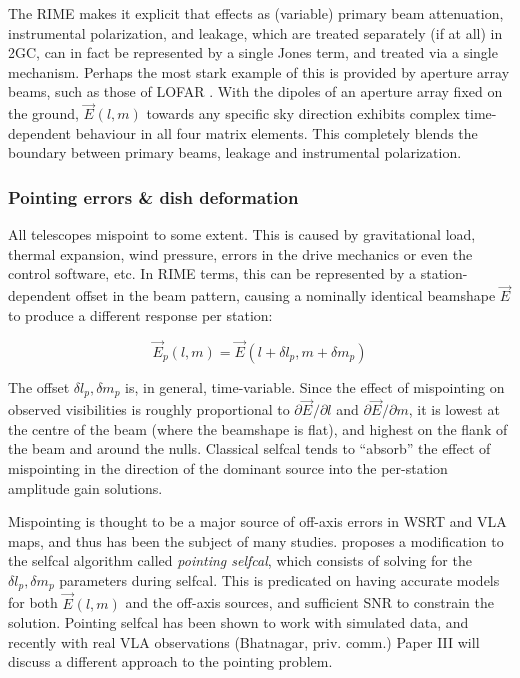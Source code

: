 \documentclass[referee]{aa}
\newcommand{\jones}[2]{\vec {#1}_{#2}}
\begin{document}
The RIME makes it explicit that effects as (variable) primary beam attenuation, instrumental polarization, and leakage, which are treated separately (if at all) in 2GC, can in fact be represented by a single Jones term, and treated via a single mechanism. Perhaps the most stark example of this is provided by aperture array beams, such as those of LOFAR \citep{Yatawatta:LOFAR-beam}. With the dipoles of an aperture array fixed on the ground, 
$\jones{E}{}(l,m)$ towards any specific sky direction exhibits complex time-dependent behaviour in all four matrix elements. This completely blends the boundary between primary beams, leakage and instrumental polarization.

\subsubsection{Pointing errors \& dish deformation\label{sec:pointing}}

All telescopes mispoint to some extent. This is caused by gravitational load, thermal expansion, wind pressure, errors in the drive mechanics or even the control software, etc. In RIME terms, this can be represented by a station-dependent offset in the beam pattern, causing a nominally identical beamshape $\jones{E}{}$ to produce a different response per station:

\begin{equation}\label{eq:mispointing}
\jones{E}{p}(l,m) = \jones{E}{}(l+\delta l_p,m+\delta m_p)
\end{equation}

The offset $\delta l_p,\delta m_p$ is, in general, time-variable. Since the effect of mispointing on observed visibilities is roughly proportional to $\partial\jones{E}{}/\partial l$ and $\partial \jones{E}{}/\partial m$, it is lowest at the centre of the beam (where the beamshape is flat), and highest on the flank of the beam and around the nulls. Classical selfcal tends to  ``absorb'' the effect of mispointing in the direction of the dominant source
into the per-station amplitude gain solutions. 

Mispointing is thought to be a major source of off-axis errors in WSRT and VLA maps, and thus has been the subject of many studies. \citet{SB:pointing} proposes a modification to the selfcal algorithm called {\em pointing selfcal}, which consists of solving for the $\delta l_p,\delta m_p$ parameters during selfcal. This is predicated on having accurate models for both $\jones{E}{}(l,m)$ and the off-axis sources, and sufficient SNR to constrain the solution. Pointing selfcal has been shown to work with simulated data, and recently with real VLA observations (Bhatnagar, priv. comm.) Paper III will discuss a different approach to the pointing problem.
\end{document}
